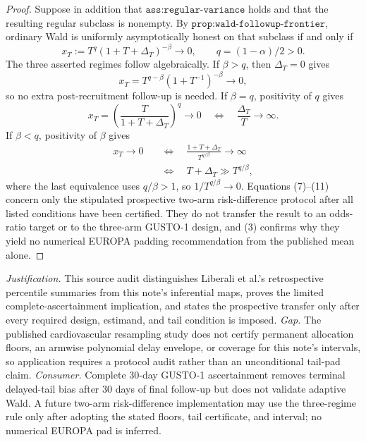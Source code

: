 \documentclass{article}
\begin{document}
\begin{proof}
Suppose in addition that \(\texttt{ass:regular-variance}\) holds and that the resulting regular subclass is nonempty.  By \(\texttt{prop:wald-followup-frontier}\), ordinary Wald is uniformly asymptotically honest on that subclass if and only if
\[
 x_T:=T^q(1+T+\Delta_T)^{-\beta}\longrightarrow0,
 \qquad q=(1-\alpha)/2>0.
\tag{8}
\]
The three asserted regimes follow algebraically.  If \(\beta>q\), then \(\Delta_T=0\) gives
\[
 x_T=T^{q-\beta}(1+T^{-1})^{-\beta}\longrightarrow0,
\tag{9}
\]
so no extra post-recruitment follow-up is needed.  If \(\beta=q\), positivity of \(q\) gives
\[
 x_T=\left(\frac{T}{1+T+\Delta_T}\right)^q\longrightarrow0
 \quad\Longleftrightarrow\quad
 \frac{\Delta_T}{T}\longrightarrow\infty.
\tag{10}
\]
If \(\beta<q\), positivity of \(\beta\) gives
\[
 \begin{aligned}
 x_T\longrightarrow0
 &\quad\Longleftrightarrow\quad
 \frac{1+T+\Delta_T}{T^{q/\beta}}\longrightarrow\infty\\
 &\quad\Longleftrightarrow\quad
 T+\Delta_T\gg T^{q/\beta},
 \end{aligned}
\tag{11}
\]
where the last equivalence uses \(q/\beta>1\), so \(1/T^{q/\beta}\to0\).  Equations (7)--(11) concern only the stipulated prospective two-arm risk-difference protocol after all listed conditions have been certified.  They do not transfer the result to an odds-ratio target or to the three-arm GUSTO-1 design, and (3) confirms why they yield no numerical EUROPA padding recommendation from the published mean alone.
\end{proof}
\par\smallskip\noindent \textit{Justification.} This source audit distinguishes Liberali et al.'s retrospective percentile summaries from this note's inferential maps, proves the limited complete-ascertainment implication, and states the prospective transfer only after every required design, estimand, and tail condition is imposed. \textit{Gap.} The published cardiovascular resampling study does not certify permanent allocation floors, an armwise polynomial delay envelope, or coverage for this note's intervals, so application requires a protocol audit rather than an unconditional tail-pad claim. \textit{Consumer.} Complete 30-day GUSTO-1 ascertainment removes terminal delayed-tail bias after 30 days of final follow-up but does not validate adaptive Wald. A future two-arm risk-difference implementation may use the three-regime rule only after adopting the stated floors, tail certificate, and interval; no numerical EUROPA pad is inferred.
\end{document}
